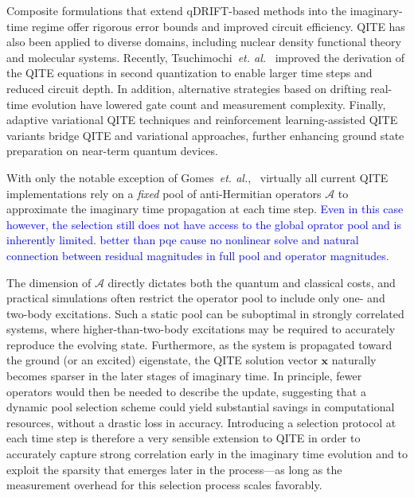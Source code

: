 \documentclass[aip,jcp,amsmath,amssymb, reprint]{revtex4-1}
\newcommand{\note}[2]{%
  \ifthenelse{\boolean{shownotes}}%
    {\textcolor{#1}{#2}}%
    {}%
}
\begin{document}
Composite formulations that extend qDRIFT-based methods into the imaginary-time regime offer rigorous error bounds and improved circuit efficiency.\cite{pocrnic2024composite, hagan2023composite} 
QITE has also been applied to diverse domains, including nuclear density functional theory\cite{li2024quantum} and molecular systems. Recently, Tsuchimochi~\textit{et. al.}~\cite{Tsuchimochi2023Improved} improved the derivation of the QITE equations in second quantization to enable larger time steps and reduced circuit depth.
In addition, alternative strategies based on drifting real-time evolution have lowered gate count and measurement complexity.\cite{huang2023efficient} 
Finally, adaptive variational QITE techniques and reinforcement learning-assisted QITE variants bridge QITE and variational approaches, further enhancing ground state preparation on near-term quantum devices.\cite{gomes2021adaptive,cao2022quantum}

With only the notable exception of Gomes~\textit{et. al.},~\cite{gomes2021adaptive} virtually all current QITE implementations rely on a \textit{fixed} pool of anti-Hermitian operators $\mathcal{A}$ to approximate the imaginary time propagation at each time step.
\note{blue}{Even in this case however, the selection still does not have access to the global oprator pool and is inherently limited. better than pqe cause no nonlinear solve and natural connection between residual magnitudes in full pool and operator magnitudes.}
The dimension of $\mathcal{A}$ directly dictates both the quantum and classical costs, and practical simulations often restrict the operator pool to include only one- and two-body excitations. 
Such a static pool can be suboptimal in strongly correlated systems, where higher-than-two-body excitations may be required to accurately reproduce the evolving state. 
Furthermore, as the system is propagated toward the ground (or an excited) eigenstate, the QITE solution vector $\mathbf{x}$ naturally becomes sparser in the later stages of imaginary time. 
In principle, fewer operators would then be needed to describe the update, suggesting that a dynamic pool selection scheme could yield substantial savings in computational resources, without a drastic loss in accuracy. Introducing a selection protocol at each time step is therefore a very sensible extension to QITE in order to accurately capture strong correlation early in the imaginary time evolution and to exploit the sparsity that emerges later in the process---as long as the measurement overhead for this selection process scales favorably. 
\end{document}
